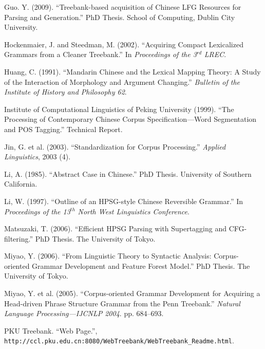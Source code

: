 \documentclass[english]{jnlp_1.4}
\begin{document}
\begin{thebibliography}{}
\item
Guo. Y. (2009). ``Treebank-based acquisition of Chinese LFG Resources for 
Parsing and Generation.'' PhD Thesis. School of Computing, Dublin City 
University.

\item
Hockenmaier, J. and Steedman, M. (2002). ``Acquiring Compact Lexicalized 
Grammars from a Cleaner Treebank.'' In \textit{Proceedings of the 3}$^{rd}$\textit{ LREC}.

\item
Huang, C. (1991). ``Mandarin Chinese and the Lexical Mapping Theory: A Study 
of the Interaction of Morphology and Argument Changing.'' \textit{Bulletin of the Institute of History and Philosophy 62}.

\item
Institute of Computational Linguistics of Peking University (1999). ``The 
Processing of Contemporary Chinese Corpus Specification---Word Segmentation 
and POS Tagging.'' Technical Report.

\item
Jin, G. et al. (2003). ``Standardization for Corpus Processing.'' \textit{Applied Linguistics}, 2003 (4).

\item
Li, A. (1985). ``Abstract Case in Chinese.'' PhD Thesis. University of 
Southern California. 

\item
Li, W. (1997). ``Outline of an HPSG-style Chinese Reversible Grammar.'' In 
\textit{Proceedings of the 13}$^{th}$\textit{ North West Linguistics Conference}.

\item
Matsuzaki, T. (2006). ``Efficient HPSG Parsing with Supertagging and 
CFG-filtering.'' PhD Thesis. The University of Tokyo.

\item
Miyao, Y. (2006). ``From Linguistic Theory to Syntactic Analysis: 
Corpus-oriented Grammar Development and Feature Forest Model.'' PhD Thesis. 
The University of Tokyo.

\item
Miyao, Y. et al. (2005). ``Corpus-oriented Grammar Development for Acquiring 
a Head-driven Phrase Structure Grammar from the Penn Treebank.'' \textit{Natural Language Processing---\mbox{IJCNLP} 2004}. pp. 684--693.

\item
PKU Treebank. ``Web Page.'', 
\texttt{http://ccl.pku.edu.cn:8080/WebTreebank/WebTreebank{\_}Readme.\linebreak[2]html}.


\end{thebibliography}
\end{document}
